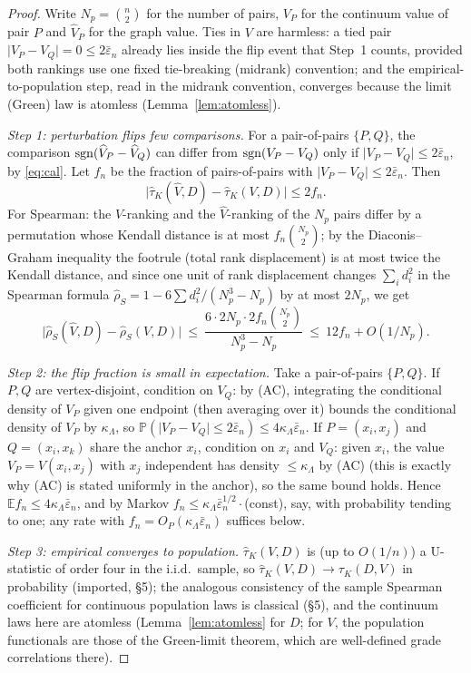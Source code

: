\begin{proof}
Write $N_p=\binom n2$ for the number of pairs, $V_P$ for the continuum value of pair
$P$ and $\widehat V_P$ for the graph value. Ties in $V$ are harmless: a tied pair
$\lvert V_P-V_Q\rvert=0\le2\bar\varepsilon_n$ already lies inside the flip event that Step~1
counts, provided both rankings use one fixed tie-breaking (midrank) convention; and the
empirical-to-population step, read in the midrank convention, converges because the limit
(Green) law is atomless (Lemma~\ref{lem:atomless}).

\emph{Step 1: perturbation flips few comparisons.} For a pair-of-pairs $\{P,Q\}$, the
comparison $\operatorname{sgn}(\widehat V_P-\widehat V_Q)$ can differ from $\operatorname{sgn}(V_P-V_Q)$ only if
$\lvert V_P-V_Q\rvert\le2\bar\varepsilon_n$, by \eqref{eq:cal}. Let $f_n$ be the
fraction of pairs-of-pairs with $\lvert V_P-V_Q\rvert\le2\bar\varepsilon_n$. Then
\[
\bigl\lvert\widehat\tau_K(\widehat V,D)-\widehat\tau_K(V,D)\bigr\rvert\le2f_n .
\]
For Spearman: the $V$-ranking and the $\widehat V$-ranking of the $N_p$ pairs differ
by a permutation whose Kendall distance is at most $f_n\binom{N_p}2$; by the
Diaconis--Graham inequality the footrule (total rank displacement) is at most twice
the Kendall distance, and since one unit of rank displacement changes
$\sum_i d_i^2$ in the Spearman formula
$\widehat\rho_S=1-6\sum d_i^2/(N_p^3-N_p)$ by at most $2N_p$, we get
\[
\bigl\lvert\widehat\rho_S(\widehat V,D)-\widehat\rho_S(V,D)\bigr\rvert
\ \le\ \frac{6\cdot 2N_p\cdot 2 f_n\binom{N_p}2}{N_p^3-N_p}\ \le\ 12f_n+O(1/N_p).
\]

\emph{Step 2: the flip fraction is small in expectation.} Take a pair-of-pairs
$\{P,Q\}$. If $P,Q$ are vertex-disjoint, condition on $V_Q$: by (AC), integrating the
conditional density of $V_P$ given one endpoint (then averaging over it) bounds the
conditional density of $V_P$ by $\kappa_\Lambda$, so
$\mathbb P(\lvert V_P-V_Q\rvert\le2\bar\varepsilon_n)\le4\kappa_\Lambda\bar\varepsilon_n$.
If $P=(x_i,x_j)$ and $Q=(x_i,x_k)$ share the anchor $x_i$, condition on $x_i$ and
$V_Q$: given $x_i$, the value $V_P=V(x_i,x_j)$ with $x_j$ independent has density
$\le\kappa_\Lambda$ by (AC) (this is exactly why (AC) is stated uniformly in the
anchor), so the same bound holds. Hence
$\mathbb E f_n\le4\kappa_\Lambda\bar\varepsilon_n$, and by Markov
$f_n\le\kappa_\Lambda\bar\varepsilon_n^{1/2}\cdot$(const), say, with probability
tending to one; any rate with $f_n=O_P(\kappa_\Lambda\bar\varepsilon_n)$ suffices
below.

\emph{Step 3: empirical converges to population.} $\widehat\tau_K(V,D)$ is (up to
$O(1/n)$) a U-statistic of order four in the i.i.d.\ sample, so
$\widehat\tau_K(V,D)\to\tau_K(D,V)$ in probability (imported, \S5); the analogous
consistency of the sample Spearman coefficient for continuous population laws is
classical (\S5), and the continuum laws here are atomless
(Lemma~\ref{lem:atomless} for $D$; for $V$, the population functionals are those of
the Green-limit theorem, which are well-defined grade correlations there).


\end{proof}
